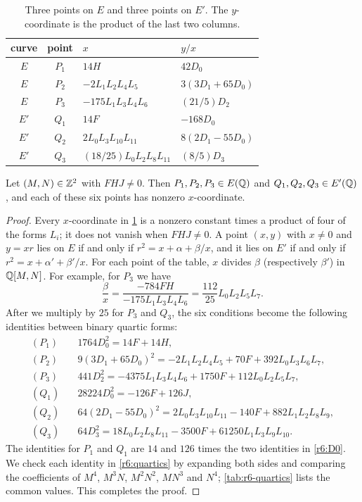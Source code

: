 \begin{table}[htbp]
\centering
\caption{Three points on $E$ and three points on $E'$. The $y$-coordinate is the product of the last two columns.}
\label{tab:r6-points}
\begin{tabular}{ccll}
\toprule
curve & point & $x$ & $y/x$\\
\midrule
$E$ & $P_1$ & $14H$ & $42D_0$\\
$E$ & $P_2$ & $-2L_1L_2L_4L_5$ & $3(3D_1+65D_0)$\\
$E$ & $P_3$ & $-175L_1L_3L_4L_6$ & $(21/5)D_2$\\
$E'$ & $Q_1$ & $14F$ & $-168D_0$\\
$E'$ & $Q_2$ & $2L_0L_3L_{10}L_{11}$ & $8(2D_1-55D_0)$\\
$E'$ & $Q_3$ & $(18/25)L_0L_2L_8L_{11}$ & $(8/5)D_3$\\
\bottomrule
\end{tabular}
\end{table}

\begin{lemma}\label{lem:r6-points}
Let $(M,N)\in\mathbb Z^2$ with $FHJ\ne0$. Then $P_1,P_2,P_3\in E(\mathbb Q)$ and $Q_1,Q_2,Q_3\in E'(\mathbb Q)$, and each of these six points has nonzero $x$-coordinate.
\end{lemma}

\begin{proof}
Every $x$-coordinate in \cref{tab:r6-points} is a nonzero constant times a product of four of the forms $L_i$; it does not vanish when $FHJ\ne0$. A point $(x,y)$ with $x\ne0$ and $y=xr$ lies on $E$ if and only if $r^2=x+\alpha+\beta/x$, and it lies on $E'$ if and only if $r^2=x+\alpha'+\beta'/x$. For each point of the table, $x$ divides $\beta$ (respectively $\beta'$) in $\mathbb Q[M,N]$. For example, for $P_3$ we have
\[
\frac{\beta}{x}=\frac{-784FH}{-175L_1L_3L_4L_6}=\frac{112}{25}L_0L_2L_5L_7.
\]
After we multiply by $25$ for $P_3$ and $Q_3$, the six conditions become the following identities between binary quartic forms:
\begin{equation}\label{r6:quartics}
\begin{aligned}
(P_1)&\quad 1764D_0^2=14F+14H,\\
(P_2)&\quad 9(3D_1+65D_0)^2=-2L_1L_2L_4L_5+70F+392L_0L_3L_6L_7,\\
(P_3)&\quad 441D_2^2=-4375L_1L_3L_4L_6+1750F+112L_0L_2L_5L_7,\\
(Q_1)&\quad 28224D_0^2=-126F+126J,\\
(Q_2)&\quad 64(2D_1-55D_0)^2=2L_0L_3L_{10}L_{11}-140F+882L_1L_2L_8L_9,\\
(Q_3)&\quad 64D_3^2=18L_0L_2L_8L_{11}-3500F+61250L_1L_3L_9L_{10}.
\end{aligned}
\end{equation}
The identities for $P_1$ and $Q_1$ are $14$ and $126$ times the two identities in \eqref{r6:D0}. We check each identity in \eqref{r6:quartics} by expanding both sides and comparing the coefficients of $M^4$, $M^3N$, $M^2N^2$, $MN^3$ and $N^4$; \cref{tab:r6-quartics} lists the common values. This completes the proof.
\end{proof}

